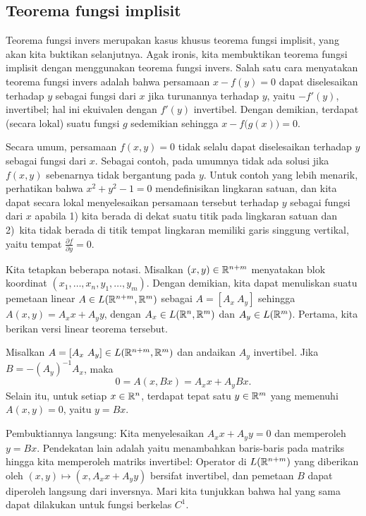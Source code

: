 \subsection{Teorema fungsi implisit}

Teorema fungsi invers merupakan kasus khusus teorema fungsi
implisit, yang akan kita buktikan selanjutnya.  Agak ironis, kita 
membuktikan teorema fungsi implisit dengan menggunakan teorema fungsi invers.
Salah satu cara menyatakan teorema fungsi invers adalah bahwa
persamaan $x-f(y) = 0$ dapat diselesaikan terhadap $y$ sebagai fungsi dari $x$ jika turunannya
terhadap $y$, yaitu $-f'(y)$, invertibel; hal ini ekuivalen dengan $f'(y)$ invertibel.
Dengan demikian, terdapat (secara lokal) suatu
fungsi $g$ sedemikian sehingga $x-f\bigl(g(x)\bigr) = 0$.

Secara umum, persamaan $f(x,y) = 0$ tidak selalu
dapat diselesaikan terhadap $y$ sebagai fungsi dari $x$.
Sebagai contoh, pada umumnya tidak ada solusi
jika $f(x,y)$ sebenarnya tidak bergantung pada $y$.
Untuk contoh yang lebih menarik, perhatikan bahwa $x^2+y^2-1 = 0$ mendefinisikan lingkaran satuan, dan
kita dapat secara lokal menyelesaikan persamaan tersebut terhadap $y$ sebagai fungsi dari $x$ apabila 1) kita berada di dekat
suatu titik pada lingkaran satuan dan 2)~kita tidak berada di titik
tempat lingkaran memiliki garis singgung vertikal, yaitu tempat
$\frac{\partial f}{\partial y} = 0$.

Kita tetapkan beberapa notasi.  Misalkan $(x,y) \in
{\mathbb{R}}^{n+m}$ menyatakan blok koordinat $(x_1,\ldots,x_n,y_1,\ldots,y_m)$.  
Dengan demikian, kita dapat menuliskan suatu
pemetaan linear $A \in L({\mathbb{R}}^{n+m},{\mathbb{R}}^m)$ sebagai
$A = [ A_x ~ A_y ]$ sehingga $A(x,y) = A_x x + A_y y$,
dengan $A_x \in L({\mathbb{R}}^n,{\mathbb{R}}^m)$ dan
$A_y \in L({\mathbb{R}}^m)$.
Pertama, kita berikan versi linear teorema tersebut.

\begin{prop}
Misalkan $A = [A_x~A_y] \in L({\mathbb{R}}^{n+m},{\mathbb{R}}^m)$ dan andaikan 
$A_y$ invertibel.  Jika $B = - {(A_y)}^{-1} A_x$, maka
\begin{equation*}
0 = A ( x, Bx) = A_x x + A_y Bx .
\end{equation*}
Selain itu, untuk setiap $x \in {\mathbb{R}}^n$, terdapat tepat satu $y \in {\mathbb{R}}^m$
yang memenuhi $A(x,y) = 0$, yaitu $y=Bx$.
\end{prop}

Pembuktiannya langsung: Kita menyelesaikan $A_x x +A_y y = 0$ dan memperoleh $y = Bx$.
Pendekatan lain adalah  yaitu menambahkan
baris-baris pada matriks hingga kita memperoleh matriks invertibel:
Operator di $L({\mathbb{R}}^{n+m})$ yang diberikan oleh
$(x,y) \mapsto (x,A_x x + A_y y)$
bersifat invertibel, dan pemetaan $B$
dapat diperoleh langsung dari inversnya.
Mari kita tunjukkan bahwa hal yang sama dapat dilakukan untuk fungsi berkelas $C^1$.

